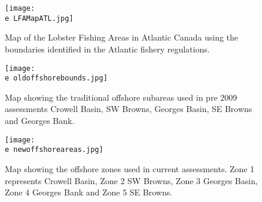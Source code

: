 \documentclass[11pt]{article}
\newcommand{\e}{/backup/bio_data/bio.lobster/figures/}
\begin{document}
\begin{landscape}
\begin{figure}
\centering
    \texttt{[image: \\e LFAMapATL.jpg]}
    \caption{Map of the Lobster Fishing Areas in Atlantic Canada using the boundaries identified in the Atlantic fishery regulations.}

\end{figure}
\end{landscape}

\begin{figure}
\centering
    \texttt{[image: \\e oldoffshorebounds.jpg]}
    \caption{Map showing the traditional offshore subareas used in pre 2009 assessments Crowell Basin, SW Browns, Georges Basin, SE Browns and Georges Bank.}

\end{figure}

\begin{figure}
\centering
    \texttt{[image: \\e newoffshoreareas.jpg]}
    \caption{Map showing the offshore zones used in current assessments. Zone 1 represents Crowell Basin, Zone 2 SW Browns, Zone 3 Georges Basin, Zone 4 Georges Bank and Zone 5 SE Browns. 
}

\end{figure}
\end{document}
